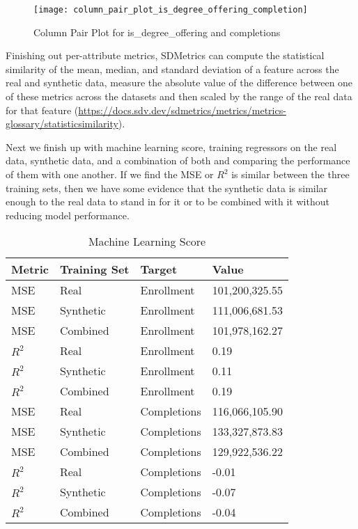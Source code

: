 \documentclass[sigconf, authorversion, nonacm]{acmart}
\begin{document}
    \begin{figure}[h]
        \centering
        \caption{Column Pair Plot for is\_degree\_offering and completions}
        \texttt{[image: column\_pair\_plot\_is\_degree\_offering\_completion]}
    \end{figure}

    Finishing out per-attribute metrics, SDMetrics can compute the statistical similarity of the mean, median, and standard deviation of a feature across the real and synthetic data, measure the absolute value of the difference between one of these metrics across the datasets and then scaled by the range of the real data for that feature (\href{https://docs.sdv.dev/sdmetrics/metrics/metrics-glossary/statisticsimilarity}{https://docs.sdv.dev/sdmetrics/metrics/metrics-glossary/statisticsimilarity}).

    Next we finish up with machine learning score, training regressors on the real data, synthetic data, and a combination of both and comparing the performance of them with one another. If we find the MSE or $R^2$ is similar between the three training sets, then we have some evidence that the synthetic data is similar enough to the real data to stand in for it or to be combined with it without reducing model performance.

    \begin{table}
        \caption{Machine Learning Score}
        \begin{tabular}{llll}
            \toprule
            Metric & Training Set & Target & Value \\
            \midrule
            MSE & Real & Enrollment & 101,200,325.55 \\
            MSE & Synthetic & Enrollment & 111,006,681.53 \\
            MSE & Combined & Enrollment & 101,978,162.27 \\
            $R^2$ & Real & Enrollment & 0.19 \\
            $R^2$ & Synthetic & Enrollment & 0.11 \\
            $R^2$ & Combined & Enrollment & 0.19 \\
            MSE & Real & Completions & 116,066,105.90 \\
            MSE & Synthetic & Completions & 133,327,873.83 \\
            MSE & Combined & Completions & 129,922,536.22 \\
            $R^2$ & Real & Completions & -0.01 \\
            $R^2$ & Synthetic & Completions & -0.07 \\
            $R^2$ & Combined & Completions & -0.04 \\
            \bottomrule
        \end{tabular}
    \end{table}
\end{document}
